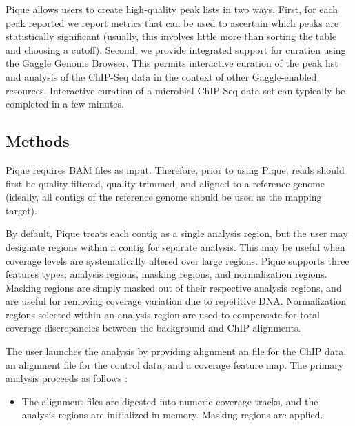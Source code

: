 \documentclass{bioinfo}
\begin{document}
Pique allows users to create high-quality peak lists in two ways.
First, for each peak reported we report metrics that can be used to
ascertain which peaks are statistically significant (usually, this
involves little more than sorting the table and choosing a
cutoff). Second, we provide integrated support for curation using the
Gaggle Genome Browser. This permits interactive curation of the peak
list and analysis of the ChIP-Seq data in the context of other
Gaggle-enabled resources. Interactive curation of a microbial ChIP-Seq
data set can typically be completed in a few minutes.

\begin{methods}
\section{Methods}

\noindent Pique requires BAM files as input\cite{sam_format}.
Therefore, prior to using Pique, reads should first be quality
filtered, quality trimmed, and aligned to a reference genome (ideally,
all contigs of the reference genome should be used as the mapping
target).

By default, Pique treats each contig as a single analysis region, but
the user may designate regions within a contig for separate analysis.
This may be useful when coverage levels are systematically altered
over large regions.  Pique supports three features types; analysis
regions, masking regions, and normalization regions. Masking regions
are simply masked out of their respective analysis regions, and are
useful for removing coverage variation due to repetitive
DNA. Normalization regions selected within an analysis region are used
to compensate for total coverage discrepancies between the background
and ChIP alignments.

The user launches the analysis by providing alignment an file for the
ChIP data, an alignment file for the control data, and a coverage
feature map. The primary analysis proceeds as follows :

\begin{itemize}

\item The alignment files are digested into numeric coverage tracks,
  and the analysis regions are initialized in memory. Masking regions
  are applied.



\end{itemize}
\end{methods}
\end{document}
